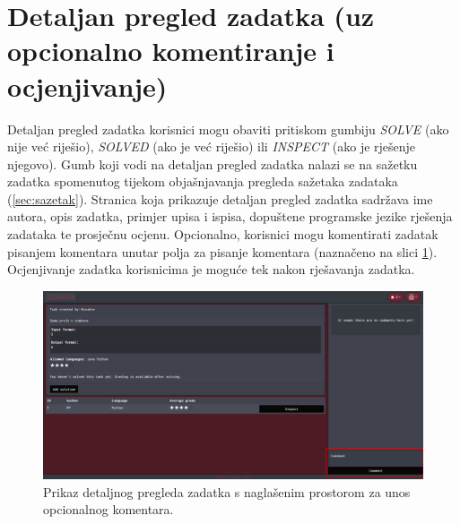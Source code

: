 \documentclass[times, utf8, zavrsni]{fer}
\begin{document}
		\section{Detaljan pregled zadatka (uz opcionalno komentiranje i ocjenjivanje)}
		Detaljan pregled zadatka korisnici mogu obaviti pritiskom gumbiju \textit{SOLVE} (ako nije već riješio), \textit{SOLVED} (ako je već riješio) ili \textit{INSPECT} (ako je rješenje njegovo). Gumb koji vodi na detaljan pregled zadatka nalazi se na sažetku zadatka spomenutog tijekom objašnjavanja pregleda sažetaka zadataka (\ref{sec:sazetak}). Stranica koja prikazuje detaljan pregled zadatka sadržava ime autora, opis zadatka, primjer upisa i ispisa, dopuštene programske jezike rješenja zadataka te prosječnu ocjenu. Opcionalno, korisnici mogu komentirati zadatak pisanjem komentara unutar polja za pisanje komentara (naznačeno na slici \ref{fig:detaljanpregled}). Ocjenjivanje zadatka korisnicima je moguće tek nakon rješavanja zadatka.
		\begin{figure}[htb]
			\centering
			\includegraphics[width=\linewidth]{pictures/koristenje/DetaljanPregledZadatka.png}
			\caption{Prikaz detaljnog pregleda zadatka s naglašenim prostorom za unos opcionalnog komentara.}
			\label{fig:detaljanpregled}
		\end{figure}
	
\end{document}

